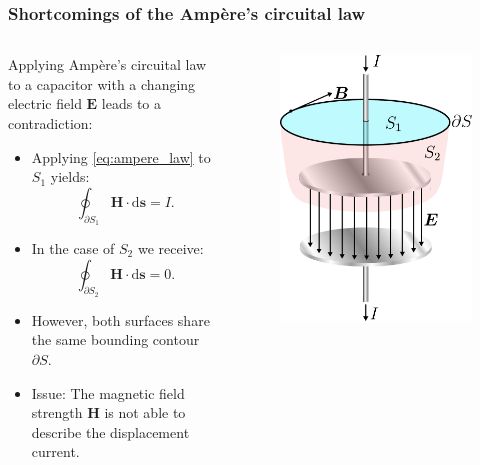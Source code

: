 \begin{frame}
	\frametitle{Shortcomings of the Amp\`ere's circuital law}
	\begin{columns}
		\begin{column}{0.55\textwidth}
			Applying Amp\`ere's circuital law to a capacitor with a changing electric field $\bm{E}$ leads to a contradiction:
            \begin{itemize}
                \item Applying \eqref{eq:ampere_law} to $S_1$ yields:
                $$\oint_{\partial S_1} \bm{H} \cdot \mathrm{d}\bm{s} = I.$$
                \item<2-> In the case of $S_2$ we receive:
                $$\oint_{\partial S_2} \bm{H} \cdot \mathrm{d}\bm{s} = 0.$$
                \item<3-> However, both surfaces share the same bounding contour $\partial S$.
                \item<4-> Issue: The magnetic field strength $\bm{H}$ is not able to describe the displacement current.
            \end{itemize}
		\end{column}
        \hfill
		\begin{column}{0.45\textwidth}
			\begin{figure}
				\centering
				\includegraphics[height=0.55\textheight]{fig/lec02/Displacement_current_in_capacitor.pdf}

\end{figure}
\end{column}
\end{columns}
\end{frame}
